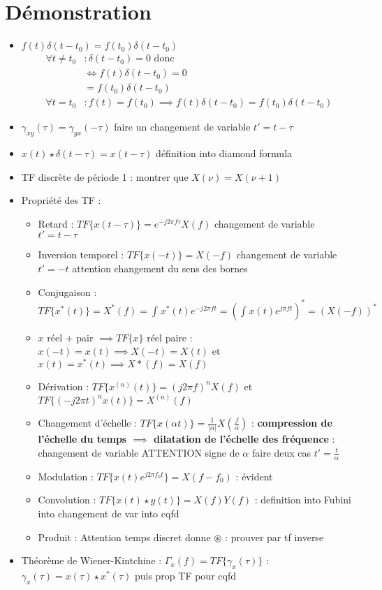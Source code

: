 \documentclass{article}
\theoremstyle{plain}%
\theoremstyle{definition}
\theoremstyle{remark}
\begin{document}
\section{Démonstration}
\begin{itemize}
    \item $ f(t) \delta(t - t_0) = f(t_0)\delta (t- t_0) $ 
    \begin{align*}
        \forall t \neq t_0 &: \delta (t - t_0) = 0 \text{ donc}\\
        &\Leftrightarrow f(t) \delta (t - t_0) = 0 \\
        &= f(t_0)\delta (t - t_0) \\
        \forall t = t_0 &: f(t) = f(t_0) \implies f(t) \delta (t - t_0) = f(t_0) \delta (t - t_0)
    \end{align*}
    \item $ \gamma _{xy} (\tau ) = \gamma _{yx} (-\tau ) $ faire un changement de variable $ t' = t - \tau  $ 
    \item $ x(t) \star \delta (t - \tau ) = x(t - \tau )$ définition into diamond formula 
    \item TF discrète de période 1 : montrer que $ X(\nu ) = X(\nu +1) $ 
    \item Propriété des TF : \begin{itemize}
        \item Retard : $ TF\{x(t - \tau )\} = e^{- j 2 \pi f \tau }X(f) $ changement de variable $ t' = t - \tau  $ 
        \item Inversion temporel : $ TF \{x(-t)\} = X(-f) $ changement de variable $ t' = - t  $ attention changement du sens des bornes
        \item Conjugaison : $ TF\{x^*(t)\} = X^*(f) = \int_{}^{}x^*(t) e^{-j 2 \pi ft} = (\int_{}^{}x(t) e^{j \pi ft})^* = (X(-f))^* $ 
        \item $ x $ réel + pair $ \implies TF\{x\} $ réel paire : $ x(-t) = x(t) \implies X(-t) = X(t) $ et $ x(t) = x^*(t) \implies X*(f) = X(f) $   
        \item Dérivation : $ TF\{x^{(n)}(t)\} = (j2 \pi f)^n X(f)$ et $ TF\{(-j2 \pi t)^n x(t)\} = X^{(n)}(f) $  
        \item Changement d'échelle : $ TF\{x(\alpha t)\} = \frac{1}{\left| \alpha  \right| }X(\frac{f}{\alpha }) $ : \textbf{compression de l'échelle du temps $ \implies  $ dilatation de l'échelle des fréquence} : changement de variable ATTENTION signe de $ \alpha  $ faire deux cas $ t' = \frac{t}{\alpha } $ 
        \item Modulation : $  TF \{x(t) e^{j 2 \pi f_0 t}\} = X(f - f_0) $ : évident 
        \item Convolution : $ TF\{x(t) \star y(t)\} =X(f)Y(f) $ : definition into Fubini into changement de var into cqfd
        \item Produit : Attention temps discret donne $ \circledast  $ : prouver par tf inverse 
    \end{itemize}
    \item Théorème de Wiener-Kintchine : $ \Gamma _x(f) = TF\{\gamma _x(\tau )\} $ : $ \gamma _x (\tau ) = x(\tau )\star x^*(\tau ) $ puis prop TF pour cqfd
\end{itemize}
\end{document}
